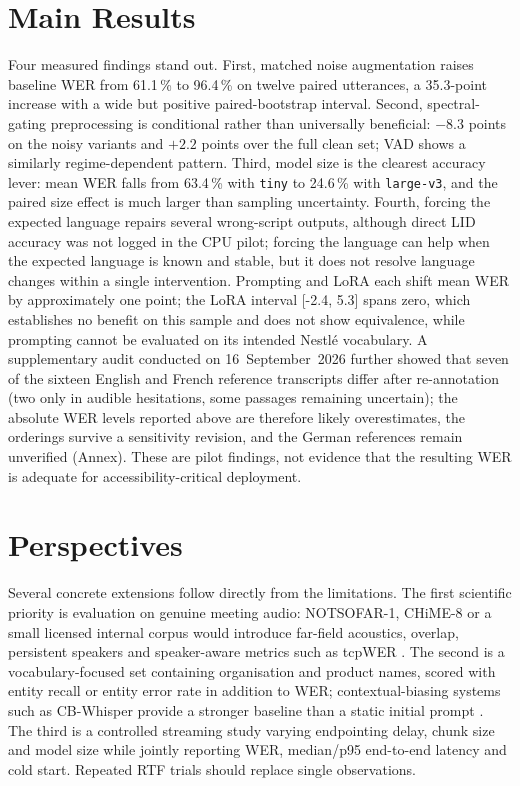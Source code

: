 \documentclass[12pt]{report}
\begin{document}
\section*{Main Results}
Four measured findings stand out. First, matched noise augmentation raises baseline WER from 61.1\,\% to 96.4\,\% on twelve paired utterances, a 35.3-point increase with a wide but positive paired-bootstrap interval. Second, spectral-gating preprocessing is conditional rather than universally beneficial: $-8.3$ points on the noisy variants and $+2.2$ points over the full clean set; VAD shows a similarly regime-dependent pattern. Third, model size is the clearest accuracy lever: mean WER falls from 63.4\,\% with \texttt{tiny} to 24.6\,\% with \texttt{large-v3}, and the paired size effect is much larger than sampling uncertainty. Fourth, forcing the expected language repairs several wrong-script outputs, although direct LID accuracy was not logged in the CPU pilot; forcing the language can help when the expected language is known and stable, but it does not resolve language changes within a single intervention. Prompting and LoRA each shift mean WER by approximately one point; the LoRA interval [-2.4, 5.3] spans zero, which establishes no benefit on this sample and does not show equivalence, while prompting cannot be evaluated on its intended Nestl\'e vocabulary. A supplementary audit conducted on 16~September~2026 further showed that seven of the sixteen English and French reference transcripts differ after re-annotation (two only in audible hesitations, some passages remaining uncertain); the absolute WER levels reported above are therefore likely overestimates, the orderings survive a sensitivity revision, and the German references remain unverified (Annex). These are pilot findings, not evidence that the resulting WER is adequate for accessibility-critical deployment.
\section*{Perspectives}
Several concrete extensions follow directly from the limitations. The first scientific priority is evaluation on genuine meeting audio: NOTSOFAR-1, CHiME-8 or a small licensed internal corpus would introduce far-field acoustics, overlap, persistent speakers and speaker-aware metrics such as tcpWER \cite{vinnikov2024notsofar,cornell2024chime8}. The second is a vocabulary-focused set containing organisation and product names, scored with entity recall or entity error rate in addition to WER; contextual-biasing systems such as CB-Whisper provide a stronger baseline than a static initial prompt \cite{li2024cbwhisper}. The third is a controlled streaming study varying endpointing delay, chunk size and model size while jointly reporting WER, median/p95 end-to-end latency and cold start. Repeated RTF trials should replace single observations.
\end{document}
